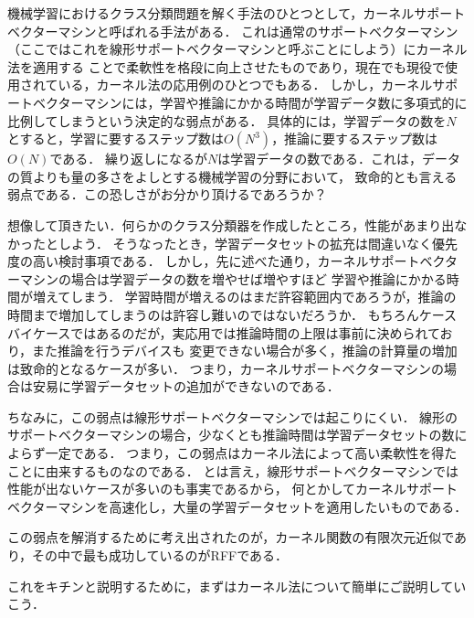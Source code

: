 %

機械学習におけるクラス分類問題を解く手法のひとつとして，カーネルサポートベクターマシンと呼ばれる手法がある．
これは通常のサポートベクターマシン（ここではこれを線形サポートベクターマシンと呼ぶことにしよう）にカーネル法を適用する
ことで柔軟性を格段に向上させたものであり，現在でも現役で使用されている，カーネル法の応用例のひとつでもある．
しかし，カーネルサポートベクターマシンには，学習や推論にかかる時間が学習データ数に多項式的に比例してしまうという決定的な弱点がある．
具体的には，学習データの数を$N$とすると，学習に要するステップ数は$O(N^3)$，推論に要するステップ数は$O(N)$である．
繰り返しになるが$N$は学習データの数である．これは，データの質よりも量の多さをよしとする機械学習の分野において，
致命的とも言える弱点である．この恐しさがお分かり頂けるであろうか？

想像して頂きたい．何らかのクラス分類器を作成したところ，性能があまり出なかったとしよう．
そうなったとき，学習データセットの拡充は間違いなく優先度の高い検討事項である．
しかし，先に述べた通り，カーネルサポートベクターマシンの場合は学習データの数を増やせば増やすほど
学習や推論にかかる時間が増えてしまう．
学習時間が増えるのはまだ許容範囲内であろうが，推論の時間まで増加してしまうのは許容し難いのではないだろうか．
もちろんケースバイケースではあるのだが，実応用では推論時間の上限は事前に決められており，また推論を行うデバイスも
変更できない場合が多く，推論の計算量の増加は致命的となるケースが多い．
つまり，カーネルサポートベクターマシンの場合は安易に学習データセットの追加ができないのである．

ちなみに，この弱点は線形サポートベクターマシンでは起こりにくい．
線形のサポートベクターマシンの場合，少なくとも推論時間は学習データセットの数によらず一定である．
つまり，この弱点はカーネル法によって高い柔軟性を得たことに由来するものなのである．
とは言え，線形サポートベクターマシンでは性能が出ないケースが多いのも事実であるから，
何とかしてカーネルサポートベクターマシンを高速化し，大量の学習データセットを適用したいものである．

この弱点を解消するために考え出されたのが，カーネル関数の有限次元近似であり，その中で最も成功しているのがRFFである．

これをキチンと説明するために，まずはカーネル法について簡単にご説明していこう．

